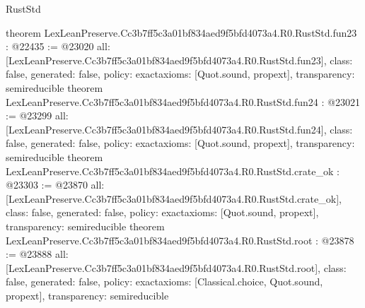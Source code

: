 \begin{lexlean}{RustStd}
\begin{coremodule}
{}
theorem LexLeanPreserve.Cc3b7ff5c3a01bf834aed9f5bfd4073a4.R0.RustStd.fun23 : @22435 := @23020 {
  all: [LexLeanPreserve.Cc3b7ff5c3a01bf834aed9f5bfd4073a4.R0.RustStd.fun23],
  class: false,
  generated: false,
  policy: exact{axioms: [Quot.sound, propext]},
  transparency: semireducible
}
theorem LexLeanPreserve.Cc3b7ff5c3a01bf834aed9f5bfd4073a4.R0.RustStd.fun24 : @23021 := @23299 {
  all: [LexLeanPreserve.Cc3b7ff5c3a01bf834aed9f5bfd4073a4.R0.RustStd.fun24],
  class: false,
  generated: false,
  policy: exact{axioms: [Quot.sound, propext]},
  transparency: semireducible
}
theorem LexLeanPreserve.Cc3b7ff5c3a01bf834aed9f5bfd4073a4.R0.RustStd.crate_ok : @23303 := @23870 {
  all: [LexLeanPreserve.Cc3b7ff5c3a01bf834aed9f5bfd4073a4.R0.RustStd.crate_ok],
  class: false,
  generated: false,
  policy: exact{axioms: [Quot.sound, propext]},
  transparency: semireducible
}
theorem LexLeanPreserve.Cc3b7ff5c3a01bf834aed9f5bfd4073a4.R0.RustStd.root : @23878 := @23888 {
  all: [LexLeanPreserve.Cc3b7ff5c3a01bf834aed9f5bfd4073a4.R0.RustStd.root],
  class: false,
  generated: false,
  policy: exact{axioms: [Classical.choice, Quot.sound, propext]},
  transparency: semireducible
}


\end{coremodule}
\end{lexlean}
